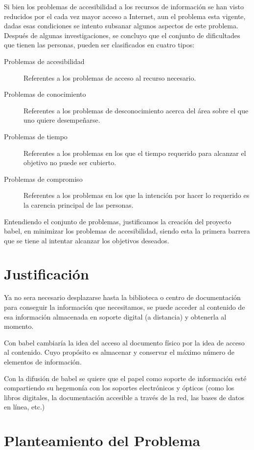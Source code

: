 \documentclass[letter,11pt,oneside,spanish]{article}
\begin{document}
Si bien los problemas de accesibilidad a los recursos de información se han visto reducidos por el
cada vez mayor acceso a Internet, aun el problema esta vigente, dadas esas condiciones se intento
subsanar algunos aspectos de este problema. Después de algunas investigaciones, se concluyo que el conjunto de dificultades que tienen las personas, pueden ser clasificados en cuatro tipos:

\begin{description}
\item [Problemas de accesibilidad] Referentes a los problemas de acceso al recurso necesario.
\item [Problemas de conocimiento] Referentes a los problemas de desconocimiento acerca del área 
sobre el que uno quiere desempeñarse.
\item [Problemas de tiempo] Referentes a los problemas en los que el tiempo requerido para alcanzar
el objetivo no puede ser cubierto.
\item [Problemas de compromiso] Referentes a los problemas en los que la intención por hacer lo
requerido es la carencia principal de las personas.
\end{description}

Entendiendo el conjunto de problemas, justificamos la creación del proyecto babel, en minimizar los
problemas de accesibilidad, siendo esta la primera barrera que se tiene al intentar alcanzar los
objetivos deseados.

\section{Justificación}
Ya no sera necesario desplazarse hasta la biblioteca o centro de documentación para conseguir la
información que necesitamos, se puede acceder al contenido de esa información almacenada en soporte
digital (a distancia) y obtenerla al momento.

Con babel cambiaría la idea del acceso al documento físico por la idea de acceso al contenido. Cuyo propósito es almacenar y conservar el máximo número de elementos de información.

Con la difusión de babel se quiere que el papel como soporte de información esté compartiendo su
hegemonía con los soportes electrónicos y ópticos (como los libros digitales, la documentación
accesible a través de la red, las bases de datos en línea, etc.)

\section{Planteamiento del Problema}
\end{document}
